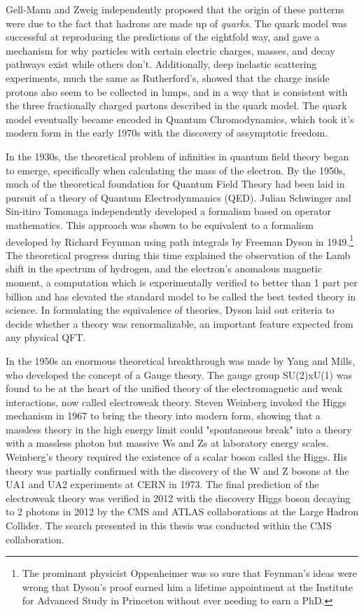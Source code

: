     Gell-Mann and Zweig independently proposed that the origin of these patterns were due to the fact that hadrons are made up of \emph{quarks}. The quark model was successful at reproducing the predictions of the eightfold way, and gave a mechanism for why particles with certain electric charges, masses, and decay pathways exist while others don't. Additionally, deep inelastic scattering experiments, much the same as Rutherford's, showed that the charge inside protons also seem to be collected in lumps, and in a way that is consistent with the three fractionally charged partons described in the quark model. \cite{proton_structure} The quark model eventually became encoded in Quantum Chromodynamics, which took it's modern form in the early 1970s with the discovery of assymptotic freedom.

    In the 1930s, the theoretical problem of infinities in quantum field theory began to emerge, specifically when calculating the mass of the electron. By the 1950s, much of the theoretical foundation for Quantum Field Theory had been laid in pursuit of a theory of Quantum Electrodynmanics (QED). Julian Schwinger and Sin-itiro Tomonaga independently developed a formalism based on operator mathematics. This approach was shown to be equivalent to a formalism developed by Richard Feynman using path integrals by Freeman Dyson in 1949.\footnote{The prominant physicist Oppenheimer was so sure that Feynman's ideas were wrong that Dyson's proof earned him a lifetime appointment at the Institute for Advanced Study in Princeton without ever needing to earn a PhD.} The theoretical progress during this time explained the observation of the Lamb shift in the spectrum of hydrogen, and the electron's anomalous magnetic moment, a computation which is experimentally verified to better than 1 part per billion and has elevated the standard model to be called the best tested theory in science. In formulating the equivalence of theories, Dyson laid out criteria to decide whether a theory was renormalizable, an important feature expected from any physical QFT.

    In the 1950s an enormous theoretical breakthrough was made by Yang and Mills, who developed the concept of a Gauge theory. The gauge group SU(2)xU(1) was found to be at the heart of the unified theory of the electromagnetic and weak interactions, now called electroweak theory. Steven Weinberg invoked the Higgs mechanism in 1967 to bring the theory into modern form, showing that a massless theory in the high energy limit could "spontaneous break" into a theory with a massless photon but massive Ws and Zs at laboratory energy scales. Weinberg's theory required the existence of a scalar boson called the Higgs. \cite{Weinberg_EWK} His theory was partially confirmed with the discovery of the W and Z bosons at the UA1 and UA2 experiments at CERN in 1973. The final prediction of the electroweak theory was verified in 2012 with the discovery Higgs boson decaying to 2 photons in 2012 by the CMS and ATLAS collaborations at the Large Hadron Collider. \cite{CMS_higgs,ATLAS_higgs} The search presented in this thesis was conducted within the CMS collaboration.

